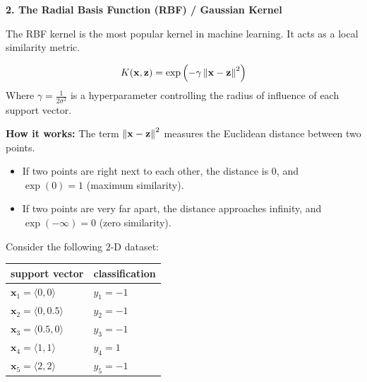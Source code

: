 \textbf{2. The Radial Basis Function (RBF) / Gaussian Kernel}

The RBF kernel is the most popular kernel in machine learning. It acts as a local similarity metric.

\begin{tcolorbox}[colback=blue!5!white,colframe=blue!75!black,title=RBF / Gaussian Kernel Formula]
\[
K(\mathbf{x}, \mathbf{z}) = \exp\left( -\gamma \left\lVert\mathbf{x} - \mathbf{z}\right\rVert^2 \right)
\]
Where $\gamma = \frac{1}{2\sigma^2}$ is a hyperparameter controlling the radius of influence of each support vector.
\end{tcolorbox}

\textbf{How it works:} The term $\left\lVert\mathbf{x} - \mathbf{z}\right\rVert^2$ measures the Euclidean distance between two points. 
  \begin{itemize}
      \item If two points are right next to each other, the distance is $0$, and $\exp(0) = 1$ (maximum similarity).
      \item If two points are very far apart, the distance approaches infinity, and $\exp(-\infty) = 0$ (zero similarity).
  \end{itemize}
  


\noindent{}

Consider the following $2$-D dataset:

\begin{tabular}{l|l}
    support vector & classification \\ \hline
    $\mathbf{x}_1 = \langle 0, 0 \rangle$ & $y_1 = -1$ \\
    $\mathbf{x}_2 = \langle 0, 0.5 \rangle$ & $y_2 = -1$ \\
    $\mathbf{x}_3 = \langle 0.5, 0 \rangle$ & $y_3 = -1$ \\
    $\mathbf{x}_4 = \langle 1, 1 \rangle$ & $y_4 = 1$ \\
    $\mathbf{x}_5 = \langle 2, 2 \rangle$ & $y_5 = -1$ \\
\end{tabular}

